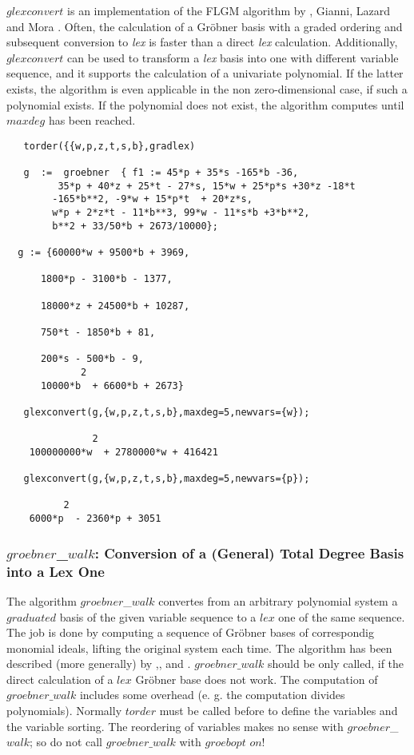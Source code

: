 $glexconvert$ is an implementation of the FLGM algorithm by
, {\sc Gianni}, {\sc Lazard} and {\sc
Mora} \cite{Faugere:89}. Often, the calculation of a Gr\"obner basis
with a graded ordering and subsequent conversion to {\it lex} is
faster than a direct {\it lex} calculation. Additionally, $glexconvert$
can be used to transform a {\it lex} basis into one with different
variable sequence, and it supports the calculation of a univariate
polynomial. If the latter exists, the algorithm is even applicable in
the non zero-dimensional case, if such a polynomial exists.
If the polynomial does not exist, the algorithm computes  until $maxdeg$
has been reached.
\begin{verbatim}
   torder({{w,p,z,t,s,b},gradlex)

   g  :=  groebner  { f1 := 45*p + 35*s -165*b -36,
         35*p + 40*z + 25*t - 27*s, 15*w + 25*p*s +30*z -18*t
        -165*b**2, -9*w + 15*p*t  + 20*z*s,
        w*p + 2*z*t - 11*b**3, 99*w - 11*s*b +3*b**2,
        b**2 + 33/50*b + 2673/10000};

  g := {60000*w + 9500*b + 3969,

      1800*p - 3100*b - 1377,

      18000*z + 24500*b + 10287,

      750*t - 1850*b + 81,

      200*s - 500*b - 9,
             2
      10000*b  + 6600*b + 2673}

   glexconvert(g,{w,p,z,t,s,b},maxdeg=5,newvars={w});

               2
    100000000*w  + 2780000*w + 416421

   glexconvert(g,{w,p,z,t,s,b},maxdeg=5,newvars={p});

          2
    6000*p  - 2360*p + 3051

\end{verbatim}

\subsubsection{$groebner$\_$walk$: Conversion of a (General) Total Degree
Basis into a Lex One}
The algorithm $groebner$\_$walk$ convertes from an arbitrary polynomial
system a $graduated$ basis of the given variable sequence to a $lex$ one
of the same sequence. The job is done by computing a sequence
of Gr\"obner bases of correspondig monomial ideals, lifting the original
system each time. The algorithm has been described (more generally) by
\cite{AGK:961},\cite{AGK:962},\cite{AG:98} and \cite{CKM:97}.
$groebner\_walk$ should be only called, if the direct calculation of a
$lex$ Gr\"obner base does not work. The computation of $groebner\_walk$
includes some overhead (e. g. the computation divides polynomials).
Normally $torder$ must be called before to define the variables and the variable
sorting. The reordering of variables makes no sense with $groebner$\_$walk$;
so do not call $groebner\_walk$ with $groebopt$ $on$!

